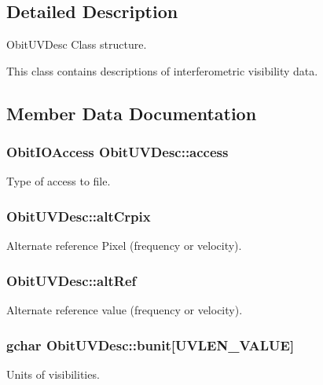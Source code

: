 \subsection{Detailed Description}
Obit\-UVDesc Class structure. 

This class contains descriptions of interferometric visibility data. 



\subsection{Member Data Documentation}
\subsubsection{\setlength{\rightskip}{0pt plus 5cm}Obit\-IOAccess {\bf Obit\-UVDesc::access}}\label{structObitUVDesc_o4}


Type of access to file. 

\subsubsection{ {\bf Obit\-UVDesc::alt\-Crpix}}\label{structObitUVDesc_o19}


Alternate reference Pixel (frequency or velocity). 

\subsubsection{ {\bf Obit\-UVDesc::alt\-Ref}}\label{structObitUVDesc_o39}


Alternate reference value (frequency or velocity). 

\subsubsection{\setlength{\rightskip}{0pt plus 5cm}gchar {\bf Obit\-UVDesc::bunit}[UVLEN\_\-VALUE]}\label{structObitUVDesc_o30}


Units of visibilities. 

